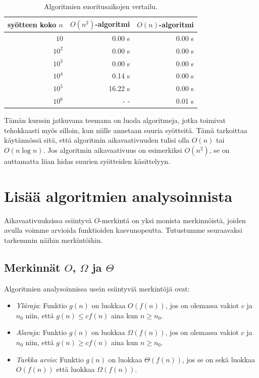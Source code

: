 \begin{table}
    \center
    \begin{tabular}{rrr}
        syötteen koko $n$ & $O(n^2)$-algoritmi & $O(n)$-algoritmi \\
        \hline
        $10$              & 0.00 s             & 0.00 s           \\
        $10^2$            & 0.00 s             & 0.00 s           \\
        $10^3$            & 0.00 s             & 0.00 s           \\
        $10^4$            & 0.14 s             & 0.00 s           \\
        $10^5$            & 16.22 s            & 0.00 s           \\
        $10^6$            & - -                & 0.01 s           \\
    \end{tabular}
    \caption{Algoritmien suoritusaikojen vertailu.}
    \label{tab:algver}
\end{table}

Tämän kurssin jatkuvana teemana on luoda algoritmeja,
jotka toimivat tehokkaasti myös silloin, kun niille annetaan suuria syötteitä.
Tämä tarkoittaa käytännössä sitä, että algoritmin aikavaativuuden tulisi
olla $O(n)$ tai $O(n \log n)$.
Jos algoritmin aikavaativuus on esimerkiksi $O(n^2)$,
se on auttamatta liian hidas suurien syötteiden käsittelyyn.

\section{Lisää algoritmien analysoinnista}

Aikavaativuuksissa esiintyvä $O$-merkintä on yksi monista merkinnöistä,
joiden avulla voimme arvioida funktioiden kasvunopeutta.
Tutustumme seuraavaksi tarkemmin näihin merkintöihin.

\subsection{Merkinnät $O$, $\Omega$ ja $\Theta$}


Algoritmien analysoinnissa usein esiintyviä merkintöjä ovat:

\begin{itemize}
    \item \emph{Yläraja}: Funktio $g(n)$ on luokkaa $O(f(n))$, jos on olemassa vakiot $c$ ja $n_0$
          niin, että $g(n) \le c f(n)$ aina kun $n \ge n_0$.
    \item \emph{Alaraja}: Funktio $g(n)$ on luokkaa $\Omega(f(n))$, jos on olemassa vakiot $c$ ja $n_0$
          niin, että $g(n) \ge c f(n)$ aina kun $n \ge n_0$.
    \item \emph{Tarkka arvio}: Funktio $g(n)$ on luokkaa $\Theta(f(n))$, jos se on sekä luokkaa $O(f(n))$
          että luokkaa $\Omega(f(n))$.
\end{itemize}

